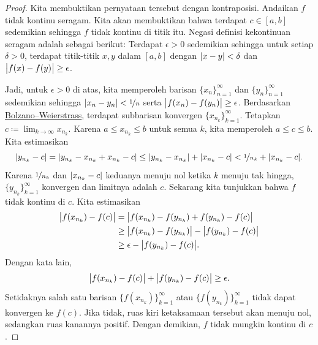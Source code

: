 \begin{proof}
Kita membuktikan pernyataan tersebut dengan kontraposisi.
Andaikan $f$ tidak kontinu seragam.  Kita akan membuktikan bahwa terdapat
$c \in [a,b]$ sedemikian sehingga $f$ tidak kontinu di titik itu.  Negasi definisi kekontinuan seragam
adalah sebagai berikut: Terdapat $\epsilon > 0$ sedemikian sehingga untuk
setiap $\delta > 0$, terdapat titik-titik $x, y$ dalam $[a,b]$ dengan
$\lvert {x-y} \rvert < \delta$ dan $\bigl\lvert {f(x)-f(y)} \bigr\rvert \geq \epsilon$.

Jadi, untuk $\epsilon > 0$ di atas, kita memperoleh barisan
$\{ x_n \}_{n=1}^\infty$ dan $\{ y_n \}_{n=1}^\infty$ sedemikian sehingga
$\lvert {x_n-y_n} \rvert < \nicefrac{1}{n}$ serta $\bigl\lvert {f(x_n)-f(y_n)} \bigr\rvert \geq
\epsilon$.  Berdasarkan
\hyperref[thm:bwseq]{Bolzano--Weierstrass},
terdapat subbarisan konvergen
$\{ x_{n_k} \}_{k=1}^\infty$.  Tetapkan $c \coloneqq \lim_{k\to\infty} x_{n_k}$.
Karena $a \leq x_{n_k} \leq b$ untuk semua $k$, kita memperoleh
$a \leq c \leq b$.  Kita estimasikan
\begin{equation*}
\lvert {y_{n_k} - c} \rvert =
\lvert {y_{n_k} - x_{n_k} + x_{n_k} - c} \rvert \leq
\lvert {y_{n_k} - x_{n_k}} \rvert
+
\lvert {x_{n_k}-c} \rvert
<
\nicefrac{1}{n_k} 
+
\lvert {x_{n_k}-c} \rvert .
\end{equation*}
Karena $\nicefrac{1}{n_k}$ dan $\lvert {x_{n_k}-c} \rvert$ keduanya menuju nol ketika
$k$ menuju tak hingga, $\{ y_{n_k} \}_{k=1}^\infty$ konvergen dan limitnya
adalah $c$.  Sekarang kita tunjukkan bahwa $f$ tidak kontinu di $c$.
Kita estimasikan
\begin{equation*}
\begin{split}
\bigl\lvert {f(x_{n_k}) - f(c)} \bigr\rvert & =
\bigl\lvert {f(x_{n_k}) - f(y_{n_k}) + f(y_{n_k}) - f(c)} \bigr\rvert \\
& \geq
\bigl\lvert {f(x_{n_k}) - f(y_{n_k})} \bigr\rvert - \bigl\lvert {f(y_{n_k}) - f(c)} \bigr\rvert \\
& \geq
\epsilon - \bigl\lvert {f(y_{n_k})-f(c)} \bigr\rvert .
\end{split}
\end{equation*}
Dengan kata lain,
\begin{equation*}
\bigl\lvert {f(x_{n_k})-f(c)} \bigr\rvert 
+
\bigl\lvert {f(y_{n_k})-f(c)} \bigr\rvert  \geq
\epsilon .
\end{equation*}
Setidaknya salah satu barisan $\bigl\{ f(x_{n_k}) \bigr\}_{k=1}^\infty$ atau
$\bigl\{ f(y_{n_k}) \bigr\}_{k=1}^\infty$ tidak dapat konvergen ke $f(c)$.
Jika tidak, ruas kiri ketaksamaan tersebut akan menuju nol, sedangkan ruas
kanannya positif.  Dengan demikian, $f$ tidak mungkin kontinu di $c$.
\end{proof}

